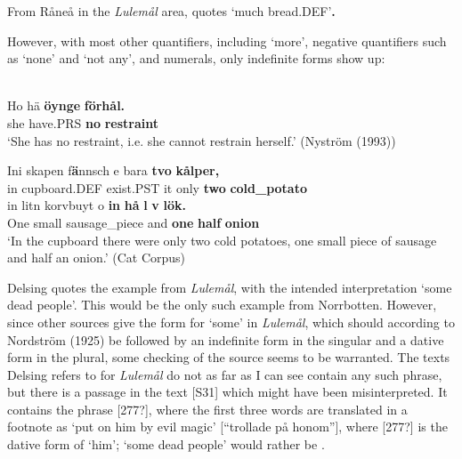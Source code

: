 \z

From Råneå in the \textit{Lulemål} area, \citet[17]{Delsing2003a} quotes\textbf{ } ‘much bread.DEF’\textbf{. }


However, with most other quantifiers, including  ‘more’, negative quantifiers such as  ‘none’ and  ‘not any’, and numerals, only indefinite forms show up:


\ea\label{}
\\
\gll Ho  hä  \textbf{öynge} \textbf{förhål.}\\
she  have.PRS  \textbf{no} \textbf{restraint}\\
\glt ‘She has no restraint, i.e. she cannot restrain herself.’ (Nyström (1993))

\z

\ea
\gll Ini  skapen  f\textbf{ä}nnsch  e  bara  \textbf{tvo} \textbf{  kålper,}\\
in  cupboard.DEF  exist.PST  it  only  \textbf{two} \textbf{cold\_potato}\\
\gll in  litn  korvbuyt  o  \textbf{in} \textbf{  hå} \textbf{l} \textbf{v} \textbf{  lök.}\\
One  small  sausage\_piece  and  \textbf{one} \textbf{half} \textbf{onion}\\
\glt ‘In the cupboard there were only two cold potatoes, one small piece of sausage and half an onion.’ (Cat Corpus)

\z

Delsing quotes the example from \textit{Lulemål}, with the intended interpretation ‘some dead people’. This would be the only such example from Norrbotten. However, since other sources give the form  for ‘some’ in \textit{Lulemål}, which should according to Nordström (1925) be followed by an indefinite form in the singular and a dative form in the plural, some checking of the source seems to be warranted. The texts Delsing refers to for \textit{Lulemål} do not as far as I can see contain any such phrase, but there is a passage in the text [S31] which might have been misinterpreted. It contains the phrase [277?], where the first three words are translated in a footnote as ‘put on him by evil magic’ [“trollade på honom”], where [277?] is the dative form of ‘him’; ‘some dead people’ would rather be . 

